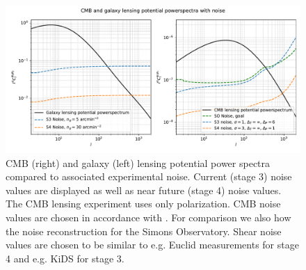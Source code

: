\documentclass[11pt]{article} %
\begin{document}
\begin{figure}[t]
    \centering
    \includegraphics[width=\textwidth]{../code/plots/spectraplusnoise.pdf}
    \caption{CMB (right) and galaxy (left) lensing potential power spectra compared to associated experimental noise. Current (stage 3) noise values are displayed as well as near future (stage 4) noise values. The CMB lensing experiment uses only polarization. CMB noise values are chosen in accordance with \cite{Namikawa_2016}. For comparison we also how the noise reconstruction for the Simons Observatory. Shear noise values are chosen to be similar to e.g. Euclid measurements for stage 4 and e.g. KiDS for stage 3.}
    \label{fig:lpsplusnoise}
\end{figure}






\end{document}
